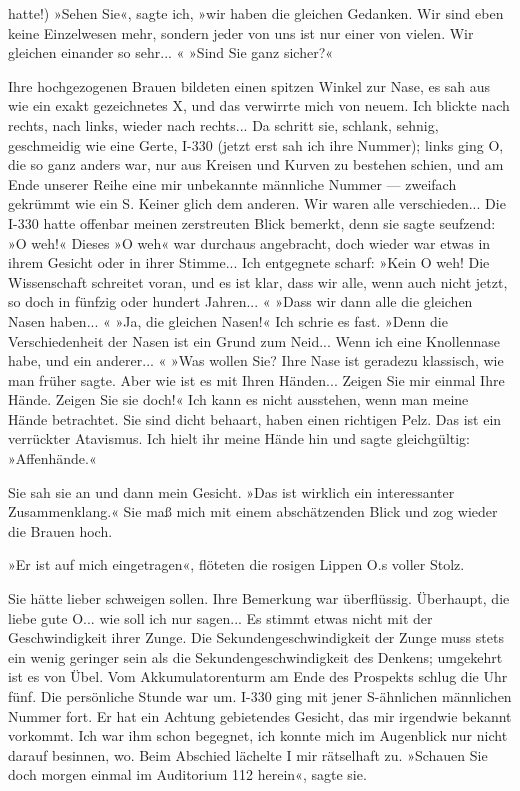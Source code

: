 hatte!) »Sehen Sie«, sagte ich, »wir haben die gleichen Gedanken.
Wir sind eben keine Einzelwesen mehr, sondern jeder von uns ist nur
einer von vielen. Wir gleichen einander so sehr... « »Sind Sie ganz
sicher?«

Ihre hochgezogenen Brauen bildeten einen spitzen Winkel zur Nase,
es sah aus wie ein exakt gezeichnetes X, und das verwirrte mich von
neuem. Ich blickte nach rechts, nach links, wieder nach rechts...
Da schritt sie, schlank, sehnig, geschmeidig wie eine Gerte, I-330
(jetzt erst sah ich ihre Nummer); links ging O, die so ganz anders
war, nur aus Kreisen und Kurven zu bestehen schien, und am Ende
unserer Reihe eine mir unbekannte männliche Nummer — zweifach
gekrümmt wie ein S. Keiner glich dem anderen. Wir waren alle
verschieden... Die I-330 hatte offenbar meinen zerstreuten Blick
bemerkt, denn sie sagte seufzend: »O weh!« Dieses »O weh« war
durchaus angebracht, doch wieder war etwas in ihrem Gesicht oder in
ihrer Stimme... Ich entgegnete scharf: »Kein O weh! Die
Wissenschaft schreitet voran, und es ist klar, dass wir alle, wenn
auch nicht jetzt, so doch in fünfzig oder hundert Jahren... « »Dass
wir dann alle die gleichen Nasen haben... « »Ja, die gleichen
Nasen!« Ich schrie es fast. »Denn die Verschiedenheit der Nasen ist
ein Grund zum Neid... Wenn ich eine Knollennase habe, und ein
anderer... « »Was wollen Sie? Ihre Nase ist geradezu klassisch, wie
man früher sagte. Aber wie ist es mit Ihren Händen... Zeigen Sie
mir einmal Ihre Hände. Zeigen Sie sie doch!« Ich kann es nicht
ausstehen, wenn man meine Hände betrachtet. Sie sind dicht behaart,
haben einen richtigen Pelz. Das ist ein verrückter Atavismus. Ich
hielt ihr meine Hände hin und sagte gleichgültig: »Affenhände.«

Sie sah sie an und dann mein Gesicht. »Das ist wirklich ein
interessanter Zusammenklang.« Sie maß mich mit einem abschätzenden
Blick und zog wieder die Brauen hoch.

»Er ist auf mich eingetragen«, flöteten die rosigen Lippen O.s
voller Stolz.

Sie hätte lieber schweigen sollen. Ihre Bemerkung war überflüssig.
Überhaupt, die liebe gute O... wie soll ich nur sagen... Es stimmt
etwas nicht mit der Geschwindigkeit ihrer Zunge. Die
Sekundengeschwindigkeit der Zunge muss stets ein wenig geringer
sein als die Sekundengeschwindigkeit des Denkens; umgekehrt ist es
von Übel. Vom Akkumulatorenturm am Ende des Prospekts schlug die
Uhr fünf. Die persönliche Stunde war um. I-330 ging mit jener
S-ähnlichen männlichen Nummer fort. Er hat ein Achtung gebietendes
Gesicht, das mir irgendwie bekannt vorkommt. Ich war ihm schon
begegnet, ich konnte mich im Augenblick nur nicht darauf besinnen,
wo. Beim Abschied lächelte I mir rätselhaft zu. »Schauen Sie doch
morgen einmal im Auditorium 112 herein«, sagte sie.

